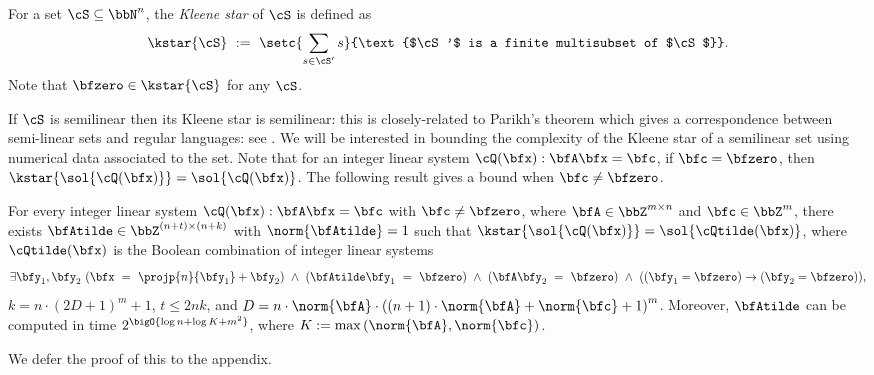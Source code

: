 
\begin{definition}
    For a set $\cS \subseteq \bbN^n$,
    the \emph{Kleene star} of $\cS$ is defined as
    \begin{equation*}
        \kstar{\cS}\ :=\ \setc{\sum_{s \in \cS'} s}{\text{$\cS'$ is a finite multisubset of $\cS$}}.
    \end{equation*}
    Note that $\bfzero \in \kstar{\cS}$ for any $\cS$.
\end{definition}

If $\cS$ is semilinear then its Kleene star is semilinear: this is closely-related to Parikh's theorem which gives a correspondence between semi-linear sets and regular languages: see \cite{parikh,kleenestar}.
We will be interested in bounding the complexity of the Kleene star of a semilinear set using numerical data associated to the set.
Note that for an integer linear system $\cQ(\bfx): \bfA \bfx = \bfc$,
if $\bfc = \bfzero$, then $\kstar{\sol{\cQ(\bfx)}} = \sol{\cQ(\bfx)}$.
The following result gives a bound when $\bfc \neq \bfzero$.

\begin{lemma}\label{lem:key}
    For every integer linear system $\cQ(\bfx): \bfA \bfx = \bfc$ with $\bfc \neq \bfzero$,
    where $\bfA \in \bbZ^{m \times n}$ and $\bfc \in \bbZ^{m}$,
    there exists $\bfAtilde \in \bbZ^{(n+t) \times (n+k)}$ with $\norm{\bfAtilde} = 1$
    such that
    $\kstar{\sol{\cQ(\bfx)}} = \sol{\cQtilde(\bfx)}$,
    where $\cQtilde(\bfx)$ is the  Boolean combination of integer linear systems
    \begin{equation*}    
        \exists \bfy_1, \bfy_2\ 
        (\bfx\ =\ \projp{n}{\bfy_1} + \bfy_2)\ \land\ 
        (\bfAtilde\bfy_1\ =\ \bfzero)\ \land\ 
        (\bfA\bfy_2\ =\ \bfzero)\ \land\ 
        ((\bfy_1=\bfzero) \to (\bfy_2=\bfzero)),
    \end{equation*}
    $k = n\cdot(2D+1)^{m} + 1$,
    $t \le 2nk$, and
    $D = n \cdot \norm{\bfA} \cdot \left((n+1)\cdot \norm{\bfA} + \norm{\bfc} + 1\right)^{m}$.
    Moreover, $\bfAtilde$ can be computed in time $2^\bigO{\log n + \log K + m^2}$,
    where $K := \max\left(\norm{\bfA}, \norm{\bfc}\right)$.
\end{lemma}

We defer the proof of this to the appendix.

